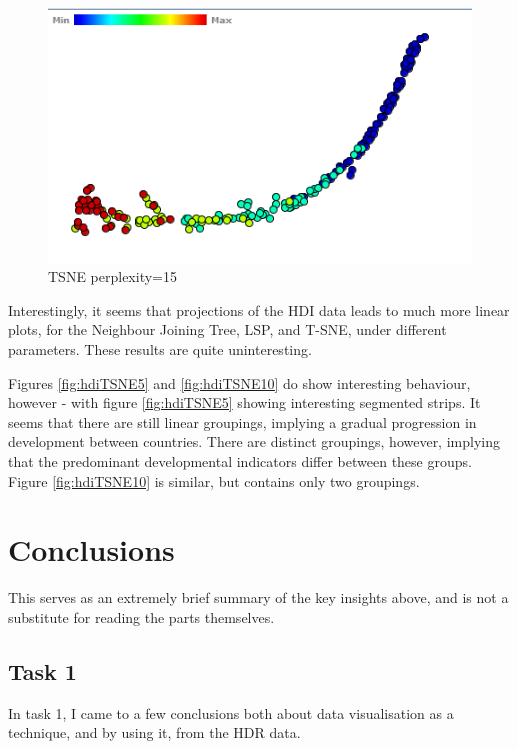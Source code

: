 \documentclass[ 10pt ]{fphw}
\begin{document}
\begin{center}
\begin{figure}[H]
    \centering
	\includegraphics[width=0.65\columnwidth]{hdiProj/hdiTSNE-15.PNG}
	\caption{TSNE perplexity=15}
	\label{fig:hdiTSNE15}
	\end{figure}
\end{center}

Interestingly, it seems that projections of the HDI data leads to much more linear plots, for the Neighbour Joining Tree, LSP, and T-SNE, under different parameters. These results are quite uninteresting.

Figures  \ref{fig:hdiTSNE5} and \ref{fig:hdiTSNE10} do show interesting behaviour, however - with figure \ref{fig:hdiTSNE5} showing interesting segmented strips. It seems that there are still linear groupings, implying a gradual progression in development between countries. There are distinct groupings, however, implying that the predominant developmental indicators differ between these groups. Figure \ref{fig:hdiTSNE10} is similar, but contains only two groupings.


\section*{Conclusions}

This serves as an extremely brief summary of the key insights above, and is not a substitute for reading the parts themselves.

\subsection*{Task 1}

In task 1, I came to a few conclusions both about data visualisation as a technique, and by using it, from the HDR data.
\end{document}
